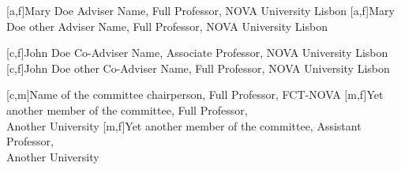 


[a,f]{Mary Doe Adviser Name, Full Professor, NOVA University Lisbon}
[a,f]{Mary Doe other Adviser Name, Full Professor, NOVA University Lisbon}

[c,f]{John Doe Co-Adviser Name, Associate Professor, NOVA University Lisbon}
[c,f]{John Doe other Co-Adviser Name, Full Professor, NOVA University Lisbon}

[c,m]{Name of the committee chairperson, Full Professor, FCT-NOVA}
[m,f]{Yet another member of the committee, Full Professor, \\Another University}
[m,f]{Yet another member of the committee, Assistant Professor, \\Another University}
